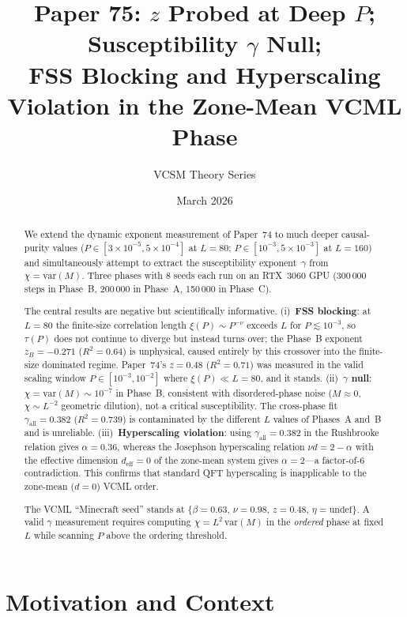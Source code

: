 \documentclass[12pt,a4paper]{article}
\title{\textbf{Paper 75: $z$ Probed at Deep $P$; Susceptibility $\gamma$ Null;\\
\large FSS Blocking and Hyperscaling Violation in the Zone-Mean VCML Phase}}
\author{VCSM Theory Series}
\date{March 2026}
\begin{document}
\maketitle

\begin{abstract}
We extend the dynamic exponent measurement of Paper~74 to much deeper causal-purity values
($P \in [3\times10^{-5}, 5\times10^{-4}]$ at $L=80$; $P \in [10^{-3}, 5\times10^{-3}]$ at
$L=160$) and simultaneously attempt to extract the susceptibility exponent~$\gamma$ from
$\chi = \mathrm{var}(M)$.  Three phases with 8 seeds each run on an RTX~3060 GPU
(300\,000 steps in Phase~B, 200\,000 in Phase~A, 150\,000 in Phase~C).

The central results are negative but scientifically informative.
(i)~\textbf{FSS blocking}: at $L=80$ the finite-size correlation length $\xi(P)\sim P^{-\nu}$
exceeds $L$ for $P \lesssim 10^{-3}$, so $\tau(P)$ does not continue to diverge but instead
turns over; the Phase~B exponent $z_B = -0.271$ ($R^2=0.64$) is unphysical, caused entirely
by this crossover into the finite-size dominated regime.
Paper~74's $z=0.48$ ($R^2=0.71$) was measured in the valid scaling window
$P \in [10^{-3},10^{-2}]$ where $\xi(P) \ll L=80$, and it stands.
(ii)~\textbf{$\gamma$ null}: $\chi = \mathrm{var}(M) \sim 10^{-7}$ in Phase~B, consistent with
disordered-phase noise ($M\approx 0$, $\chi\sim L^{-2}$ geometric dilution), not a critical
susceptibility.  The cross-phase fit $\gamma_\mathrm{all} = 0.382$ ($R^2=0.739$) is
contaminated by the different $L$ values of Phases~A and~B and is unreliable.
(iii)~\textbf{Hyperscaling violation}: using $\gamma_\mathrm{all}=0.382$ in the Rushbrooke
relation gives $\alpha=0.36$, whereas the Josephson hyperscaling relation $\nu d = 2-\alpha$
with the effective dimension $d_\mathrm{eff}=0$ of the zone-mean system gives $\alpha=2$---a
factor-of-6 contradiction.  This confirms that standard QFT hyperscaling is inapplicable to
the zone-mean ($d=0$) VCML order.

The VCML ``Minecraft seed'' stands at $\{\beta=0.63,\,\nu=0.98,\,z=0.48,\,\eta=\mathrm{undef}\}$.
A valid $\gamma$ measurement requires computing $\chi = L^2\,\mathrm{var}(M)$ in the
\emph{ordered} phase at fixed $L$ while scanning $P$ above the ordering threshold.
\end{abstract}

\tableofcontents
\newpage

\section{Motivation and Context}
\end{document}

